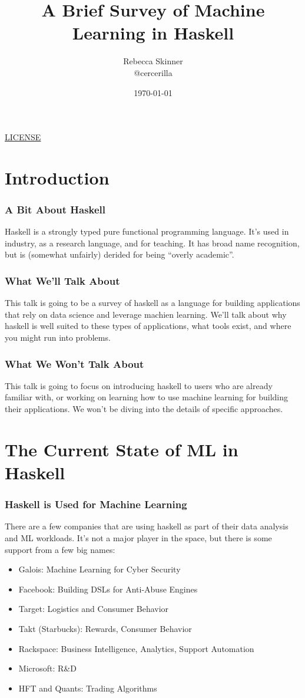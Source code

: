 \documentclass{beamer}
\title{A Brief Survey of Machine Learning in Haskell}
\author{Rebecca Skinner\\ \small{@cercerilla}}
\date{\today}
\newcommand{\chref}[3] {
  {\color{#1} \href{#2}{\underline{#3}}}
}
\begin{document}
\begin{frame}
  \titlepage{}
  \begin{center}
    \small{\chref{blue}{http://creativecommons.org/licenses/by-sa/4.0/}{LICENSE}}
  \end{center}
\end{frame}

\section{Introduction}

\begin{frame}
  \frametitle{A Bit About Haskell}
  Haskell is a strongly typed pure functional programming language.
  It's used in industry, as a research language, and for teaching.  It
  has broad name recognition, but is (somewhat unfairly) derided for
  being ``overly academic''.
\end{frame}

\begin{frame}
  \frametitle{What We'll Talk About}
  This talk is going to be a survey of haskell as a language for
  building applications that rely on data science and leverage machien
  learning.  We'll talk about why haskell is well suited to these
  types of applications, what tools exist, and where you might run
  into problems.
\end{frame}

\begin{frame}
  \frametitle{What We Won't Talk About}
  This talk is going to focus on introducing haskell to users who are
  already familiar with, or working on learning how to use machine
  learning for building their applications.  We won't be diving into
  the details of specific approaches.
\end{frame}

\section{The Current State of ML in Haskell}

\begin{frame}
  \frametitle{Haskell is Used for Machine Learning}
  There are a few companies that are using haskell as part of their
  data analysis and ML workloads.  It's not a major player in the
  space, but there is some support from a few big names:
  \begin{itemize}
  \item Galois: Machine Learning for Cyber Security
  \item Facebook: Building DSLs for Anti-Abuse Engines
  \item Target: Logistics and Consumer Behavior
  \item Takt (Starbucks): Rewards, Consumer Behavior
  \item Rackspace: Business Intelligence, Analytics, Support Automation
  \item Microsoft: R\&D
  \item HFT and Quants: Trading Algorithms
  \end{itemize}
\end{frame}
\end{document}
